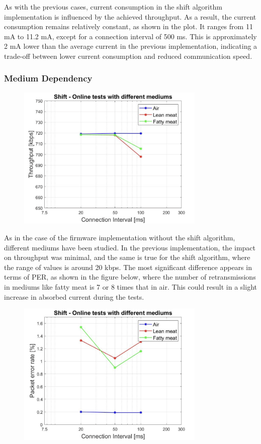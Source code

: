 \documentclass{Configuration_Files/PoliMi3i_thesis}
\begin{document}
As with the previous cases, current consumption in the shift algorithm implementation is influenced by the achieved throughput. As a result, the current consumption remains relatively constant, as shown in the plot. It ranges from 11 mA to 11.2 mA, except for a connection interval of 500 ms. This is approximately 2 mA lower than the average current in the previous implementation, indicating a trade-off between lower current consumption and reduced communication speed.

\subsubsection*{Medium Dependency}

\begin{figure}[h!]
    \centering
    \includegraphics[width=0.8\textwidth]{Results Manuel/figure20}
    \label{fig:figure1}
\end{figure}

As in the case of the firmware implementation without the shift algorithm, different mediums have been studied. In the previous implementation, the impact on throughput was minimal, and the same is true for the shift algorithm, where the range of values is around 20 kbps. The most significant difference appears in terms of PER, as shown in the figure below, where the number of retransmissions in mediums like fatty meat is 7 or 8 times that in air. This could result in a slight increase in absorbed current during the tests.

\begin{figure}[h!]
    \centering
    \includegraphics[width=0.8\textwidth]{Results Manuel/figure21}
    \label{fig:figure1}
\end{figure}
\end{document}
